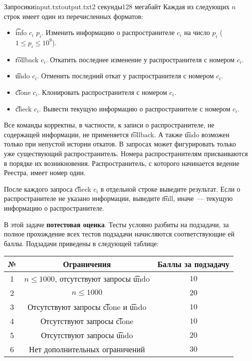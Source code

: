 \begin{problem}{Запросики}{input.txt}{output.txt}{2 секунды}{128 мегабайт}
Каждая из следующих $n$ строк имеет один из перечисленных форматов:

\begin{itemize}
\item \t{info $c_i$ $p_i$}. Изменить информацию о распространителе $c_i$ на число $p_i$ ($1 \le p_i \le 10^9$).
\item \t{rollback $c_i$}. Откатить последнее изменение у распространителя с номером $c_i$.
\item \t{undo $c_i$}. Отменить последний откат у распространителя с номером $c_i$.
\item \t{clone $c_i$}. Клонировать распространителя с номером $c_i$.
\item \t{check $c_i$}. Вывести текущую информацию о распространителе с номером $c_i$.
\end{itemize}

Все команды корректны, в частности, к записи о распространителе, не содержащей информации, не применяется \t{rollback}. А также \t{undo} возможен только при непустой истории откатов. В запросах может фигурировать только уже существующий распространитель. Номера распространителям присваиваются в порядке их возникновения. Распространитель, с которого начинается ведение Реестра, имеет номер один.

\OutputFile

После каждого запроса \t{check $c_i$} в отдельной строке выведите результат. Если о распространителе не указано информации, выведите \t{null}, иначе~--- текущую информацию о распространителе.

\Examples

\begin{example}
%
\end{example}

\Scoring

В этой задаче \textbf{потестовая оценка}. Тесты условно разбиты на подзадачи, за полное прохождение всех тестов подзадачи начисляются соответствующие ей баллы. Подзадачи приведены в следующей таблице:

\medskip

\begin{tabular}{| c | c | c |} \hline
	№ & Ограничения & Баллы за подзадачу \\ \hline
	1 & $n \le 1000$, отсутствуют запросы \t{undo} & $10$ \\ \hline
	2 & $n \le 1000$ & $20$ \\ \hline
	3 & Отсутствуют запросы \t{clone} и \t{undo} & $10$ \\ \hline
	4 & Отсутствуют запросы \t{clone} & $10$ \\ \hline
	5 & Отсутствуют запросы \t{undo} & $20$ \\ \hline
	6 & Нет дополнительных ограничений & $30$ \\ \hline
\end{tabular}

\end{problem}

